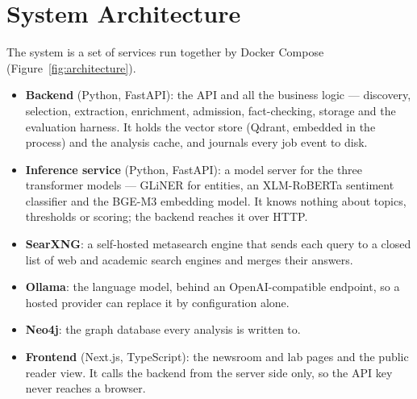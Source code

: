 
\section{System Architecture}
\label{sec:architecture}

The system is a set of services run together by Docker Compose
(Figure~\ref{fig:architecture}).

\begin{itemize}
    \item \textbf{Backend} (Python, FastAPI): the API and all the
    business logic --- discovery, selection, extraction, enrichment,
    admission, fact-checking, storage and the evaluation harness. It
    holds the vector store (Qdrant, embedded in the process) and the
    analysis cache, and journals every job event to disk.
    \item \textbf{Inference service} (Python, FastAPI): a model server
    for the three transformer models --- GLiNER for entities, an
    XLM-RoBERTa sentiment classifier and the BGE-M3 embedding model.
    It knows nothing about topics, thresholds or scoring; the backend
    reaches it over HTTP.
    \item \textbf{SearXNG}: a self-hosted metasearch engine that sends
    each query to a closed list of web and academic search engines and
    merges their answers.
    \item \textbf{Ollama}: the language model, behind an
    OpenAI-compatible endpoint, so a hosted provider can replace it by
    configuration alone.
    \item \textbf{Neo4j}: the graph database every analysis is written
    to.
    \item \textbf{Frontend} (Next.js, TypeScript): the newsroom and lab
    pages and the public reader view. It calls the backend from the
    server side only, so the API key never reaches a browser.
\end{itemize}

